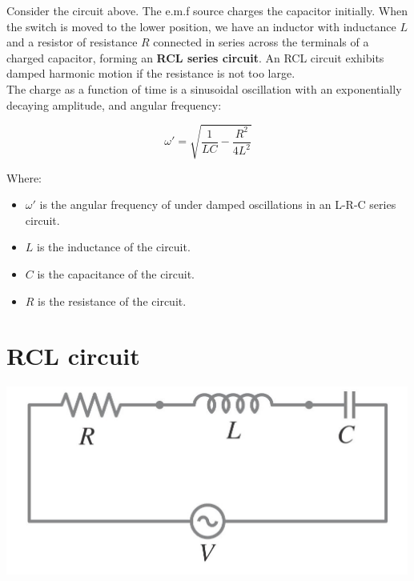 \documentclass[11pt]{article}
\begin{document}
Consider the circuit above. The e.m.f source charges the capacitor initially. When the switch is moved to the lower position, we have an inductor with inductance \(L\) and a resistor of resistance \(R\) connected in series across the terminals of a charged capacitor, forming an \textbf{RCL series circuit}. An RCL circuit exhibits damped harmonic motion if the resistance is not too large.
\\[0pt]

The charge as a function of time is a sinusoidal oscillation with an exponentially decaying amplitude, and angular frequency:

\[\omega ' = \sqrt{\frac{1}{LC} - \frac{R^2}{4L^2}}\]

Where:
\begin{itemize}
\item \(\omega '\) is the angular frequency of under damped oscillations in an L-R-C series circuit.
\item \(L\) is the inductance of the circuit.
\item \(C\) is the capacitance of the circuit.
\item \(R\) is the resistance of the circuit.
\end{itemize}


\section{RCL circuit}
\label{sec:orgec043c1}
\begin{center}
\includegraphics[width=.9\linewidth]{./images/rcl-circuit-with-source.png}
\end{center}
\end{document}
